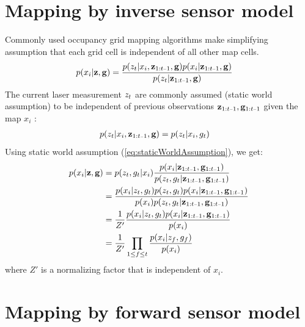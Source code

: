 \documentclass[letterpaper, 10 pt, conference]{ieeeconf} %
\begin{document}
\section{Mapping by inverse sensor model}
Commonly used occupancy grid mapping algorithms make simplifying assumption
that each grid cell is independent of all other map cells. 
\begin{align}
  p(x_i|\measurements, \poses) &= \frac{p(\meas_t |x_i, \measurements_{\prevtime}, \poses)p(x_i|\measurements_{\prevtime}, \poses)}
                         {p(\meas_t|\measurements_{\prevtime}, \poses)}
\end{align}
The current laser measurement $z_t$ are commonly assumed (static world assumption) \cite{thrun2003learning} to be independent of previous observations $\pastobs$ given the map $x_i$ :
\begin{align}
  p(\meas_t |x_i, \measurements_{\prevtime}, \poses) &= p(\meas_t |x_i, \pose_t)
 \label{eq:staticWorldAssumption}
\end{align}
Using static world assumption (\eqref{eq:staticWorldAssumption}), we get:
\begin{align}
 p(x_i|\measurements, \poses) &= p(\meas_t, \pose_t|x_i)\frac{p(x_i|\pastobs)}
                                           {p(\meas_t, \pose_t|\pastobs)}\\
                 &= \frac{p(x_i|\meas_t, \pose_t)p(\meas_t,\pose_t) p(x_i|\pastobs)} {p(x_i) p(\meas_t, \pose_t|\pastobs)}\\
                 &= \frac{1}{Z'}\frac{p(x_i|\meas_t, \pose_t)p(x_i|\pastobs)}{p(x_i)}\\
                 &= \frac{1}{Z'}\prod_{1\le f \le t} \frac{p(x_i|\meas_f, \pose_f)}{p(x_i)}
\end{align}
where $Z'$ is a normalizing factor that is independent of $x_i$.


\section{Mapping by forward sensor model}
\end{document}
